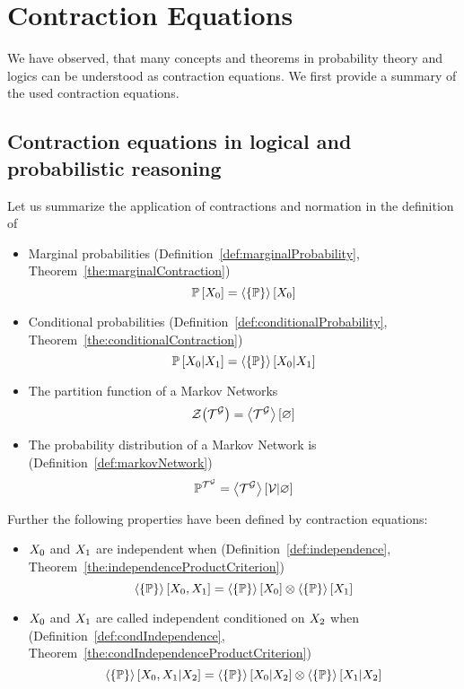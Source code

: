 \section{Contraction Equations}

We have observed, that many concepts and theorems in probability theory and logics can be understood as contraction equations.
We first provide a summary of the used contraction equations.

\subsection{Contraction equations in logical and probabilistic reasoning}

Let us summarize the application of contractions and normation in the definition of
\begin{itemize}
	\item Marginal probabilities (Definition~\ref{def:marginalProbability}, Theorem~\ref{the:marginalContraction})
		\[ \mathbb{P}\left[X_{0}\right] = \left\langle \left\{\mathbb{P}\right\}\right\rangle \left[ X_{0} \right] \]
	\item Conditional probabilities (Definition~\ref{def:conditionalProbability}, Theorem~\ref{the:conditionalContraction})
		\[ \mathbb{P}\left[X_{0}|X_{1}\right] = \left\langle \left\{\mathbb{P}\right\}\right\rangle \left[ X_{0} | X_{1} \right] \]
	\item The partition function of a Markov Networks 
		\begin{align*}
			\mathcal{Z}{\left(\mathcal{T}^{\mathcal{G}}\right)} = \left\langle \mathcal{T}^{\mathcal{G}}\right\rangle \left[ \varnothing \right]
		\end{align*}
	\item The probability distribution of a Markov Network is (Definition~\ref{def:markovNetwork})
		\begin{align*}
			\mathbb{P}^{\mathcal{T}^{\mathcal{G}}} = \left\langle \mathcal{T}^{\mathcal{G}}\right\rangle \left[ \mathcal{V} | \varnothing \right]
		\end{align*}
\end{itemize}


Further the following properties have been defined by contraction equations:
\begin{itemize}
	\item $X_{0}$ and $X_{1}$ are independent when (Definition~\ref{def:independence}, Theorem~\ref{the:independenceProductCriterion})
		\[  \left\langle \left\{\mathbb{P}\right\}\right\rangle \left[ X_{0},X_{1} \right] 
		=  \left\langle \left\{\mathbb{P}\right\}\right\rangle \left[ X_{0} \right] 
			\otimes  \left\langle \left\{\mathbb{P}\right\}\right\rangle \left[ X_{1} \right] \]
	\item $X_{0}$ and $X_{1}$ are called independent conditioned on $X_{2}$ when (Definition~\ref{def:condIndependence}, Theorem~\ref{the:condIndependenceProductCriterion})
		\[ \left\langle \left\{\mathbb{P}\right\}\right\rangle \left[ X_{0},X_{1} | X_{2} \right] 
		= \left\langle \left\{\mathbb{P}\right\}\right\rangle \left[ X_{0} | X_{2} \right] 
		\otimes \left\langle \left\{\mathbb{P}\right\}\right\rangle \left[ X_{1} | X_{2} \right] \]
\end{itemize}






